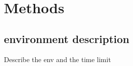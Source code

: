 \chapter{Methods}
\label{cha:Methods}
\lipsum \autocite{DBLP:books/sp/HarderR01}



\section{environment description}
Describe the env and the time limit
\label{time_limit}
